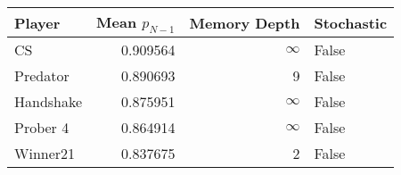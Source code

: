 \begin{tabular}{lrrl}
\toprule
    Player &  Mean $p_{N-1}$ &  Memory Depth & Stochastic \\
\midrule
        CS &        0.909564 &            \(\infty\) &      False \\
  Predator &        0.890693 &             9 &      False \\
 Handshake &        0.875951 &            \(\infty\) &      False \\
  Prober 4 &        0.864914 &            \(\infty\) &      False \\
  Winner21 &        0.837675 &             2 &      False \\
\bottomrule
\end{tabular}
